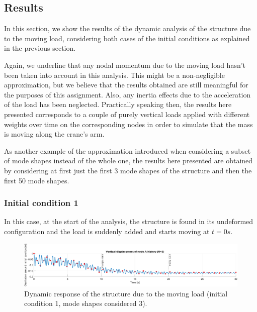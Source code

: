 \subsection{Results}
\label{subsec:results}

In this section, we show the results of the dynamic analysis of the structure due to the moving load, considering both cases of the initial conditions as explained in the previous section.

Again, we underline that any nodal momentum due to the moving load hasn't been taken into account in this analysis.
This might be a non-negligible approximation, but we believe that the results obtained are still meaningful for the purposes of this assignment.
Also, any inertia effects due to the acceleration of the load has been neglected.
Practically speaking then, the results here presented corresponds to a couple of purely vertical loads applied with different weights over time on the corresponding nodes in order to simulate that the mass is moving along the crane's arm.

As another example of the approximation introduced when considering a subset of mode shapes instead of the whole one, the results here presented are obtained by considering at first just the first 3 mode shapes of the structure and then the first 50 mode shapes.

\subsubsection{Initial condition 1}
\label{subsubsec:initial_condition_1}

In this case, at the start of the analysis, the structure is found in its undeformed configuration and the load is suddenly added and starts moving at $t = 0s$.

\begin{figure}[H]
    \centering
    \includegraphics[width=\textwidth]{img/MATLAB/Responses/Moving_load_history_condition_1_modes_3.png}
    \caption{Dynamic response of the structure due to the moving load (initial condition 1, mode shapes considered 3).}
    \label{fig:moving_loads_response_initial_condition_1_modes_3}
\end{figure}

